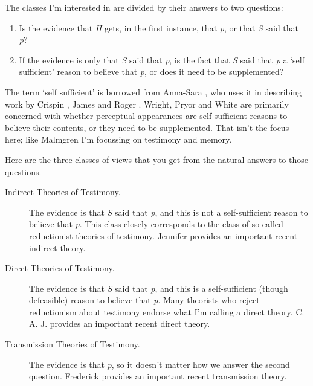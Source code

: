 The classes I'm interested in are divided by their answers to two questions:

\begin{enumerate}
\item Is the evidence that \emph{H} gets, in the first instance, that \emph{p}, or that \emph{S} said that \emph{p}?

\item If the evidence is only that \emph{S} said that \emph{p}, is the fact that \emph{S} said that \emph{p} a `self sufficient' reason to believe that \emph{p}, or does it need to be supplemented?

\end{enumerate}
The term `self sufficient' is borrowed from Anna-Sara  \citet{Malmgren2006}, who uses it in describing work by Crispin  \citet{Wright2002, Wright2004}, James  \citet{Pryor2004} and Roger  \citet{White2005}. Wright, Pryor and White are primarily concerned with whether perceptual appearances are self sufficient reasons to believe their contents, or they need to be supplemented. That isn't the focus here; like Malmgren I'm focussing on testimony and memory. 

Here are the three classes of views that you get from the natural answers to those questions.

\begin{description}

\item[Indirect Theories of Testimony.]

The evidence is that \emph{S} said that \emph{p}, and this is not a self-sufficient reason to believe that \emph{p}. This class closely corresponds to the class of so-called reductionist theories of testimony. Jennifer  \citet{Lackey2008} provides an important recent indirect theory.

\item[Direct Theories of Testimony.]

The evidence is that \emph{S} said that \emph{p}, and this is a self-sufficient (though defeasible) reason to believe that \emph{p}. Many theorists who reject reductionism about testimony endorse what I'm calling a direct theory. C. A. J.  \citet{Coady1995} provides an important recent direct theory.

\item[Transmission Theories of Testimony.]

The evidence is that \emph{p}, so it doesn't matter how we answer the second question. Frederick  \citet{Schmitt2006} provides an important recent transmission theory.
\end{description}

